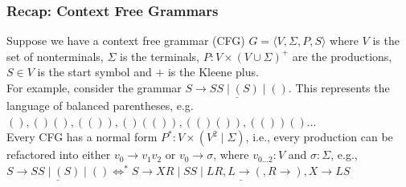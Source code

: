 \documentclass{beamer}
\begin{document}
    \begin{frame}
        \frametitle{Recap: Context Free Grammars}
        Suppose we have a context free grammar (CFG) $G = \langle V, \Sigma, P, S\rangle$ where $V$ is the set of nonterminals, $\Sigma$ is the terminals, $P: V\times (V \cup \Sigma)^+$ are the productions, $S\in V$ is the start symbol and $+$ is the Kleene plus.\newline\\
        For example, consider the grammar $\underline{S \rightarrow S S \mid ( S ) \mid ()}$. This represents the language of balanced parentheses, e.g. $(), ()(), (()), ()(()), (()()), (())()\ldots$\newline\\
        Every CFG has a normal form $P^*: V \times (V^2 \mid \Sigma)$, i.e., every production can be refactored into either $v_0 \rightarrow v_1 v_2$ or $v_0 \rightarrow \sigma$, where $v_{0\ldots2}: V$ and $\sigma: \Sigma$, e.g., $\underline{S \rightarrow S S \mid ( S ) \mid ()}\Leftrightarrow^*\underline{S\rightarrow XR \mid SS \mid LR, L \rightarrow (, R \rightarrow ), X\rightarrow LS}$


\end{frame}
\end{document}

